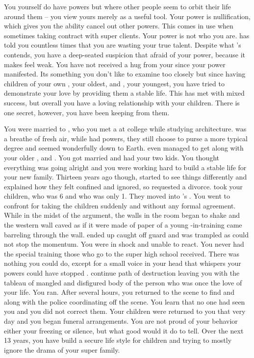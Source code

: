 \documentclass[char]{LRSguildcamp1}
\begin{document}
You yourself do have powers but where other people seem to orbit their life around them -- you view yours merely as a useful tool. Your power is nullification, which gives you the ability cancel out other powers. This comes in use when sometimes taking contract with super clients. Your power is not who you are. \cGrandma{} has told you countless times that you are wasting your true talent. Despite what \cGrandma{} 's contends, you have a deep-seated suspicion that \cGrandma{\theyare} afraid of your power, because it makes \cGrandma{\them} feel weak. You have not received a hug from your \cGrandma{\parent} since your power manifested. Its something you don't like to examine too closely but since having children of your own \cTeen{}, your oldest, and \cTween{}, your youngest, you have tried to demonstrate your love by providing them a stable life. This has met with mixed success, but overall you have a loving relationship with your children.  There is one secret, however, you have been keeping from them. 

You were married to \cAS{}, who you met a at college while studying architecture. \cAS{} was a breathe of fresh air, while \cAS{\they} had powers, they still choose to purse a more typical degree and seemed wonderfully down to Earth. \cAS{} even managed to get along with your older \cOldest{\sibling}, \cOldest{} and \cOldest{\their} \cOS{\spouse} \cOS{}. You got married and had your two kids. You thought everything was going alright and you were working hard to build a stable life for your new family.  Thirteen years ago though, \cAS{} started to see things differently and \cAS{\they} explained how they felt confined and ignored, so requested a divorce. \cAS{} took your children, \cTeen{} who was 6 and \cTween{} who was only 1. They moved into \cOldest{}'s . You went to confront \cAS{} for taking the children suddenly and without any formal agreement.  While in the midst of the argument, the walls in the room began to shake and the western wall caved as if it were made of paper of a young \cJuggernaut{\hero}-in-training \cJuggernaut{} came barreling through the wall. \cAS{} ended up caught off guard and was trampled as \cJuggernaut{} could not stop the momentum. You were in shock and unable to react. You never had the special training those who go to the super high school received. There was nothing you could do, except for a small voice in your head that whispers your powers could have stopped \cJuggernaut{}. \cJuggernaut{} continue \cJuggernaut{\their} path of destruction leaving you with the tableau of mangled and disfigured body of the person who was once the love of your life. You ran. After several hours, you returned to the scene to find \cOS{} and \cOldest{} along with the police coordinating off the scene. You learn that no one had seen you and you did not correct them. Your children were returned to you that very day and you began funeral arrangements. You are not proud of your behavior either your freezing or silence, but what good would it do to tell. Over the next 13 years, you have build a secure life style for children and trying to mostly ignore the drama of your super family. 
\end{document}
